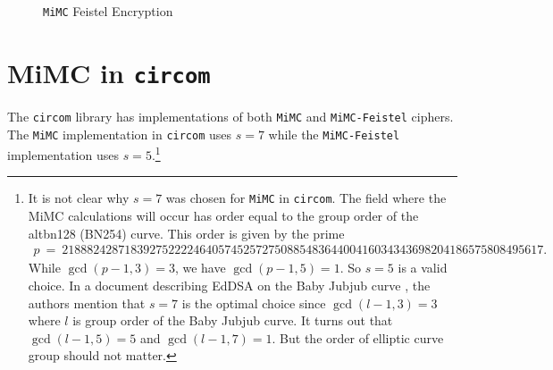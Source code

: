 \documentclass[10pt]{article}
\begin{document}
\begin{figure}[t]
\begin{center}
\end{center}
\caption{\texttt{MiMC} Feistel Encryption}%
\label{fig:MiMCFeistelEncryption}
\end{figure}


\section{MiMC in \texttt{circom}}%
\label{sec:mimc_in_circom}
The \texttt{circom} library \cite{circomlib} has implementations of both \texttt{MiMC} and \texttt{MiMC-Feistel} ciphers. The \texttt{MiMC} implementation in \texttt{circom} uses $s=7$ while the \texttt{MiMC-Feistel} implementation uses $s=5$.\footnote{
It is not clear why $s=7$ was chosen for \texttt{MiMC} in \texttt{circom}. The field where the MiMC calculations will occur has order equal to the group order of the alt\textunderscore bn128 (BN254) curve. This order is given by the prime
\begin{align*}
{\scriptstyle
  p\  =\  21888242871839275222246405745257275088548364400416034343698204186575808495617.
}
\end{align*}
While $\gcd(p-1, 3) = 3$, we have $\gcd(p-1, 5)=1$. So $s=5$ is a valid choice. In a document describing EdDSA on the Baby Jubjub curve \cite{eddsa_babyjubjub_mimc7}, the authors mention that $s=7$ is the optimal choice since $\gcd(l-1, 3)=3$ where $l$ is group order of the Baby Jubjub curve. It turns out that $\gcd(l-1, 5)=5$ and $\gcd(l-1, 7)=1$. But the order of elliptic curve group should not matter.
}
\end{document}
